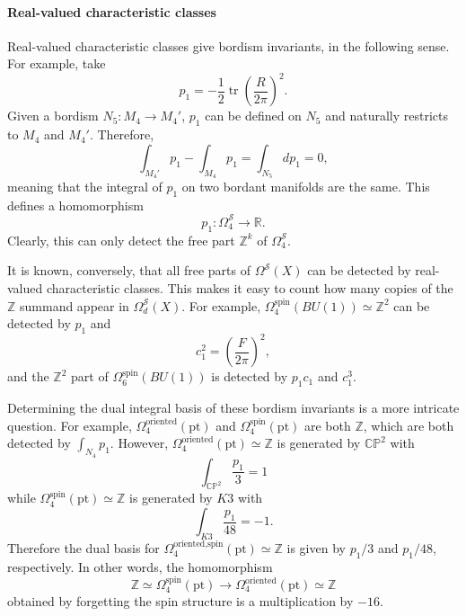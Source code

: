\documentclass[12pt]{article}
\numberwithin{equation}{section}
\numberwithin{figure}{section}
\theoremstyle{remark}
\def\bR{\mathbb{R}}
\def\bZ{\mathbb{Z}}
\def\cS{\mathcal{S}}
\def\CP{\mathbb{CP}}
\def\pt{\mathrm{pt}}
\def\tr{\mathop{\mathrm{tr}}\nolimits}
\begin{document}
\paragraph{Real-valued characteristic classes}
Real-valued characteristic classes give bordism invariants, in the following sense.
For example, take \begin{equation}
  p_1=-\frac12\tr \left(\frac{R}{2\pi}\right)^2.
\end{equation}
Given a bordism $N_5: M_4\to M_4'$, $p_1$ can be defined on $N_5$ and 
naturally restricts to $M_4$ and $M_4'$.
Therefore, \begin{equation}
\int_{M_4'}p_1-\int_{M_4}p_1=\int_{N_5}dp_1 = 0,
\end{equation} meaning that the integral of $p_1$ on two bordant manifolds are the same.
This defines a homomorphism \begin{equation}
p_1: \Omega^\cS_4\to \bR .
\end{equation} 
Clearly, this can only detect the free part $\bZ^k$ of $\Omega^\cS_4$.

It is known, conversely, that all free parts of $\Omega^\cS(X)$
can be detected by real-valued characteristic classes.
This makes it easy to count how many copies of the $\bZ$ summand appear in $\Omega^\cS_d(X)$.
For example, $\Omega^\text{spin}_4(BU(1))\simeq \bZ^2$ can be detected by $p_1$ and \begin{equation}
c_1^2 = (\frac{F}{2\pi})^2,
\end{equation} and the $\bZ^2$ part of $\Omega^\text{spin}_6(BU(1))$ is detected by $p_1 c_1$ and $c_1^3$.

Determining the dual integral basis of these bordism invariants is a more intricate question.
For example, $\Omega^\text{oriented}_4(\pt)$ and $\Omega^\text{spin}_4(\pt)$ are both $\bZ$,
which are both detected by $\int_{N_4} p_1$.
However, $\Omega^\text{oriented}_4(\pt)\simeq \bZ$  is generated by $\CP^2$ with \begin{equation}
\int_{\CP^2} \frac{p_1}3=1
\end{equation} while $\Omega^\text{spin}_4(\pt)\simeq \bZ$ is generated by $K3$ with \begin{equation}
\int_{K3} \frac{p_1}{48}=-1.
\end{equation}
Therefore the dual basis for $\Omega^\text{oriented,spin}_4(\pt)\simeq \bZ$ is given by $p_1/3$ and $p_1/48$, respectively. 
In other words, the homomorphism \begin{equation}
\bZ\simeq \Omega^\text{spin}_4(\pt) \to \Omega^\text{oriented}_4(\pt) \simeq \bZ
\end{equation} obtained by forgetting the spin structure is a multiplication by $-16$.
\end{document}
